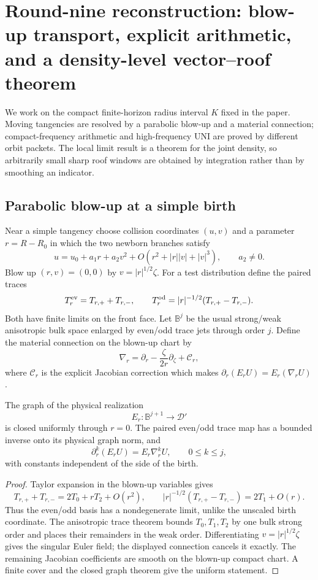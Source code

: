 \section{Round-nine reconstruction: blow-up transport, explicit arithmetic, and a density-level vector--roof theorem}
\label{sec:r9-a2}

We work on the compact finite-horizon radius interval $K$ fixed in the paper.
Moving tangencies are resolved by a parabolic blow-up and a material
connection; compact-frequency arithmetic and high-frequency UNI are proved by
different orbit packets.  The local limit result is a theorem for the joint
density, so arbitrarily small sharp roof windows are obtained by integration
rather than by smoothing an indicator.

\subsection{Parabolic blow-up at a simple birth}

Near a simple tangency choose collision coordinates $(u,v)$ and a parameter
$r=R-R_0$ in which the two newborn branches satisfy
\[
 u=u_0+a_1r+a_2v^2+O(r^2+|r||v|+|v|^3),
 \qquad a_2\ne0.
\]
Blow up $(r,v)=(0,0)$ by $v=|r|^{1/2}\zeta$.  For a test distribution define
the paired traces
\[
 T^{\rm ev}_r=T_{r,+}+T_{r,-},
 \qquad
 T^{\rm od}_r=|r|^{-1/2}(T_{r,+}-T_{r,-}).
\]
Both have finite limits on the front face.  Let $\mathbb B^j$ be the usual
strong/weak anisotropic bulk space enlarged by even/odd trace jets through
order $j$.  Define the material connection on the blown-up chart by
\[
 \nabla_r=\partial_r-\frac{\zeta}{2r}\partial_\zeta+\mathcal C_r,
\]
where $\mathcal C_r$ is the explicit Jacobian correction which makes
$\partial_r(E_rU)=E_r(\nabla_rU)$.

\begin{lemma}
\label{lem:r9-a2-birth}
The graph of the physical realization
\[
 E_r:\mathbb B^{j+1}\longrightarrow\mathscr D'
\]
is closed uniformly through $r=0$.  The paired even/odd trace map has a bounded
inverse onto its physical graph norm, and
\[
 \partial_r^k(E_rU)=E_r\nabla_r^kU,
 \qquad 0\le k\le j,
\]
with constants independent of the side of the birth.
\end{lemma}

\begin{proof}
Taylor expansion in the blown-up variables gives
\[
 T_{r,+}+T_{r,-}=2T_0+rT_2+O(r^2),
 \qquad
 |r|^{-1/2}(T_{r,+}-T_{r,-})=2T_1+O(r).
\]
Thus the even/odd basis has a nondegenerate limit, unlike the unscaled birth
coordinate.  The anisotropic trace theorem bounds $T_0,T_1,T_2$ by one bulk
strong order and places their remainders in the weak order.  Differentiating
$v=|r|^{1/2}\zeta$ gives the singular Euler field; the displayed connection
cancels it exactly.  The remaining Jacobian coefficients are smooth on the
blown-up compact chart.  A finite cover and the closed graph theorem give the
uniform statement.
\end{proof}

